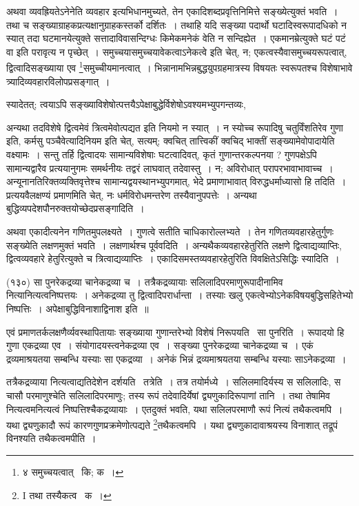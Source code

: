 \documentclass[11pt, openany]{book}
\begin{document}
{अथवा व्यवह्रियतेऽनेनेति व्यवहार इत्यभिधानमुच्यते, तेन एकादिशब्दप्रवृत्तिनिमित्ते सङ्ख्येत्युक्तं भवति~। तथा च सङ्ख्याग्राहकप्रत्यक्षानुग्राहकस्तर्को दर्शितः~। तथाहि यदि सङ्ख्या पदार्थो घटादिस्वरूपादधिको न स्यात् तदा घटमानयेत्युक्ते सत्तादाविवासन्दिग्धः किमेकमनेकं वेति न सन्दिह्येत~। एकमानम्रेत्युक्ते घटं पटं वा इति परावृत्य न पृच्छेत्~। समुच्चयासमुच्चयावेकत्वाऽनेकत्वे इति चेत्, न; एकत्वस्यैवासमुच्चयरूपत्वात्, द्वित्वादिसङ्ख्याया एव \renewcommand{\thefootnote}{4}\footnote{४ समुच्चयत्वात् \textendash\ कि; क~।}समुच्चीयमानत्वात्~। भिन्नानामभिन्नबुद्धयुपग्रहमात्रस्य विषयतः स्वरूपतश्च विशेषाभावे त्र्यादिव्यवहारविलोपप्रसङ्गात्~।

स्यादेतत्; त्वयाऽपि सङ्ख्याविशेषोत्पत्तयैऽपेक्षाबुद्धेर्विशेषोऽवश्यमभ्युपगन्तव्यः,

\newpage
\noindent
अन्यथा तदविशेषे द्वित्वमेवं त्रित्वमेवोत्पद्यत इति नियमो न स्यात्~। न स्योच्च रूपादिषु चतुर्विंशतिरेव गुणा इति, कर्मसु पञ्चैवेत्यादिनियम इति चेत्, सत्यम्; क्वचित् तात्त्विकीं क्वचिद् भाक्तीं सङ्ख्यामेवोपादायेति वक्ष्यामः~। सन्तु तर्हि द्वित्वादयः सामान्यविशेषाः घटत्वादिवत्, कृतं गुणान्तरकल्पनया ? गुणपक्षेऽपि सामान्यद्वारैव प्रत्ययानुगमः समर्थनीयः तद्वरं लाघवात् तदेवास्तु~। न; अविरोधात् परापरभावाभावाच्च~। अन्यूनानतिरिक्तव्यक्तिवृत्तेश्च सामान्यद्वयस्थानभ्युपगमात्, भेदे प्रमाणाभावात् विरुद्धधर्माध्यासो हि तदिति~। प्रत्ययवैलक्षण्यं प्रमाणमिति चेत्, नः धर्मविरोधमन्तरेण तस्यैवानुपपत्तेः~। अन्यथा बुद्धिव्यपदेशपौनरुक्तयोच्छेदप्रसङ्गादिति~।

अथवा एकादीत्यनेन गणितमुपलक्ष्यते~। गुणत्वे सतीति चाधिकारोल्लभ्यते~। तेन गणितव्यवहारहेतुर्गुणः सङ्ख्येति लक्षणमुक्तं भवति~। लक्षणार्थश्च पूर्ववदिति~। अन्यथैकव्यवहारहेतुरिति लक्षणे द्वित्वाद्यव्याप्तिः, द्वित्वव्यवहारे हेतुरित्युक्ते च त्रित्वाद्यव्याप्तिः~। एकादिसमस्तव्यवहारहेतुरिति विवक्षितेऽसिद्धिः स्यादिति~।

\hangindent=2cm {\knu (१३०) सा पुनरेकद्रव्या चानेकद्रव्या च~। तत्रैकद्रव्यायाः सलिलादिपरमाणुरूपादीनामिव नित्यानित्यत्वनिष्पत्तयः~। अनेकद्रव्या तु द्वित्वादिपरार्धान्ता~। तस्याः खलु एकत्वेभ्योऽनेकविषयबुद्धिसहितेभ्यो निष्पत्तिः~। अपेक्षाबुद्धिविनाशाद्विनाश इति~॥}

एवं प्रमाणतर्कलक्षणैर्व्यवस्थापितायाः सङ्ख्याया गुणान्तरेभ्यो विशेषं निरूपयति \textendash\ {\knu सा पुनरिति~।} रूपादयो हि गुणा एकद्रव्या एव~। संयोगादयस्त्वनेकद्रव्या एव~। सङ्ख्या पुनरेकद्रव्या चानेकद्रव्या च~। एकं द्रव्यमाश्रयतया सम्बन्धि यस्याः सा एकद्रव्या~। अनेकं भिन्नं द्रव्यमाश्रयतया सम्बन्धि यस्याः साऽनेकद्रव्या~।

तत्रैकद्रव्याया नित्यत्वाद्यतिदेशेन दर्शयति \textendash\ तत्रेति~। तत्र तयोर्मध्ये~। सलिलमादिर्यस्य स सलिलादिः, स चासौ परमाणुश्चेति सलिलादिपरमाणुः; तस्य रूपं तदेवादिर्येषां द्व्यणुकादिरूपाणां तानि~। तथा तेषामिव नित्यत्वमनित्यत्वं निष्पत्तिश्चैकद्रव्यायाः~। एतदुक्तं भवति, यथा सलिलपरमाणौ रूपं नित्यं तथैकत्वमपि~। यथा द्व्यणुकादौ रूपं कारणगुणप्रक्रमेणोत्पद्यते \renewcommand{\thefootnote}{1}\footnote{I तथा तस्यैकत्व \textendash\ क~।}तथैकत्वमपि~। यथा द्व्यणुकादावाश्रयस्य विनाशात् तद्रूपं विनश्यति तथैकत्वमपीति~।

}
\end{document}
